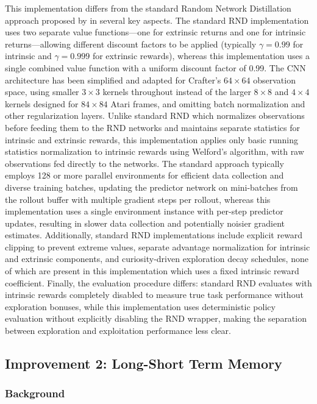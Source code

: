 \documentclass[twocolumn]{article}
\begin{document}
This implementation differs from the standard Random Network Distillation approach proposed by \cite{burda2018exploration} in several key aspects. The standard RND implementation uses two separate value functions---one for extrinsic returns and one for intrinsic returns---allowing different discount factors to be applied (typically $\gamma=0.99$ for intrinsic and $\gamma=0.999$ for extrinsic rewards), whereas this implementation uses a single combined value function with a uniform discount factor of 0.99. The CNN architecture has been simplified and adapted for Crafter's $64 \times 64$ observation space, using smaller $3 \times 3$ kernels throughout instead of the larger $8 \times 8$ and $4 \times 4$ kernels designed for $84 \times 84$ Atari frames, and omitting batch normalization and other regularization layers. Unlike standard RND which normalizes observations before feeding them to the RND networks and maintains separate statistics for intrinsic and extrinsic rewards, this implementation applies only basic running statistics normalization to intrinsic rewards using Welford's algorithm, with raw observations fed directly to the networks. The standard approach typically employs 128 or more parallel environments for efficient data collection and diverse training batches, updating the predictor network on mini-batches from the rollout buffer with multiple gradient steps per rollout, whereas this implementation uses a single environment instance with per-step predictor updates, resulting in slower data collection and potentially noisier gradient estimates. Additionally, standard RND implementations include explicit reward clipping to prevent extreme values, separate advantage normalization for intrinsic and extrinsic components, and curiosity-driven exploration decay schedules, none of which are present in this implementation which uses a fixed intrinsic reward coefficient. Finally, the evaluation procedure differs: standard RND evaluates with intrinsic rewards completely disabled to measure true task performance without exploration bonuses, while this implementation uses deterministic policy evaluation without explicitly disabling the RND wrapper, making the separation between exploration and exploitation performance less clear.
\subsection*{Improvement 2: Long-Short Term Memory}

\subsubsection*{Background}
\end{document}
